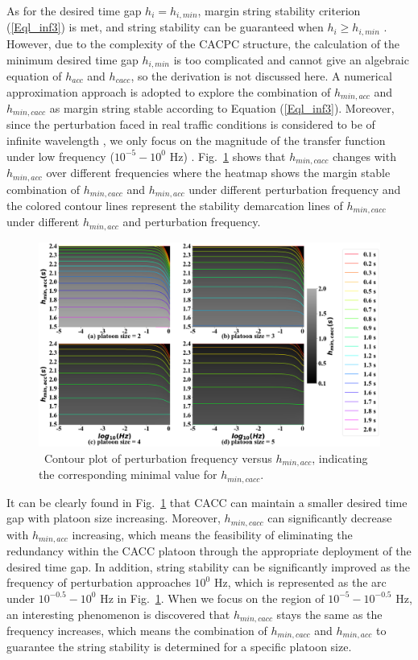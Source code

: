 \documentclass[trsc,nonblindrev]{informs3} %
\begin{document}
As for the desired time gap $h_i=h_{i,min}$, margin string stability criterion (\ref{Eql_inf3}) is met, and string stability can be guaranteed when $h_i\ge h_{i,min}$ \citep{naus2010string}. However, due to the complexity of the CACPC structure, the calculation of the minimum desired time gap $h_{i,min}$ is too complicated and cannot give an algebraic equation of $h_{acc}$ and $h_{cacc}$, so the derivation is not discussed here. A numerical approximation approach is adopted to explore the combination of $h_{min,acc}$ and $h_{min,cacc}$ as margin string stable according to Equation (\ref{Eql_inf3}). Moreover, since the perturbation faced in real traffic conditions is considered to be of infinite wavelength \citep{bian2019reducing,xiao2011practical}, we only focus on the magnitude of the transfer function under low frequency ($10^{-5} - 10^0$ Hz) \citep{Oncu2014}. Fig.~\ref{fig4} shows that $h_{min,cacc}$ changes with $h_{min,acc}$ over different frequencies where the heatmap shows the margin stable combination of $h_{min,cacc}$ and $h_{min,acc}$ under different perturbation frequency and the colored contour lines represent the stability demarcation lines of $h_{min,cacc}$ under different $h_{min,acc}$ and perturbation frequency.

\begin{figure}
    \centering
    \includegraphics[width=14cm]{figs/fig4.png}
    \caption{~Contour plot of perturbation frequency versus $h_{min,acc}$, indicating the corresponding minimal value for $h_{min,cacc}$.}
    \label{fig4}
\end{figure}

It can be clearly found in Fig.~\ref{fig4} that CACC can maintain a smaller desired time gap with platoon size increasing. Moreover, $h_{min,cacc}$ can significantly decrease with $h_{min,acc}$ increasing, which means the feasibility of eliminating the redundancy within the CACC platoon through the appropriate deployment of the desired time gap. In addition, string stability can be significantly improved as the frequency of perturbation approaches $10^0$ Hz, which is represented as the arc under $10^{-0.5} - 10^0$ Hz in Fig.~\ref{fig4}. When we focus on the region of $10^{-5} - 10^{-0.5}$ Hz, an interesting phenomenon is discovered that $h_{min,cacc}$ stays the same as the frequency increases, which means the combination of $h_{min,cacc}$ and $h_{min,acc}$ to guarantee the string stability is determined for a specific platoon size.
\end{document}
